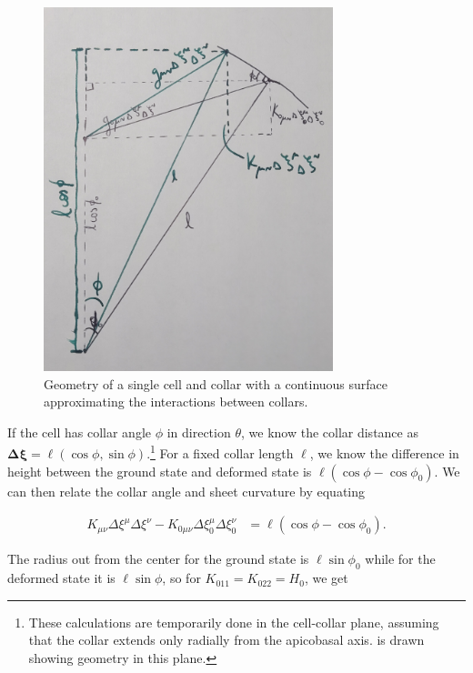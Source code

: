 \begin{figure}[htbp]
    \centering
    \includegraphics[width=0.75\textwidth]{geom.jpg}
    \caption[Geometry for continuous approximation of \textit{C. flexa} sheets]{Geometry of a single cell and collar with a continuous surface approximating the interactions between collars.}
    \label{fig:geom}
\end{figure}

If the cell has collar angle $\phi$ in direction $\theta$, we know the collar distance as $\bm{\Delta\xi} = \ell(\cos\phi, \sin\phi)$.\footnote{These calculations are temporarily done in the cell-collar plane, assuming that the collar extends only radially from the apicobasal axis.  is drawn showing geometry in this plane.} 
For a fixed collar length $\ell$, we know the difference in height between the ground state and deformed state is $\ell(\cos\phi - \cos\phi_0)$. 
We can then relate the collar angle and sheet curvature by equating 

\begin{align}
    K_{\mu\nu}\Delta\xi^\mu\Delta\xi^\nu - K_{0\mu\nu}\Delta\xi_0^\mu\Delta\xi_0^\nu &= \ell(\cos\phi - \cos\phi_0). \label{eq:base}
\end{align}

The radius out from the center for the ground state is $\ell\sin\phi_0$ while for the deformed state it is $\ell\sin\phi$, so for $K_{011}=K_{022}=H_0$, we get

